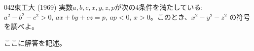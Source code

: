 \begin{prob}{042}{}{東工大 (1969)}
 実数$a,b,c,x,y,z,p$が次の4条件を満たしている: $a^2-b^2-c^2>0$, $ax+by+cz=p$, $ap<0$, $x>0$。このとき、$x^2-y^2-z^2$ の符号を調べよ。
\end{prob}
ここに解答を記述。